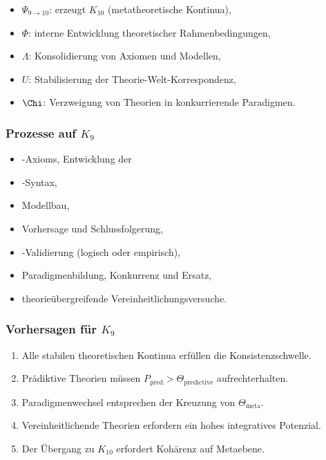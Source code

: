 \begin{itemize}
    \item $\Psi_{9\to10}$: erzeugt $K_{10}$ (metatheoretische Kontinua),
    \item $\Phi$: interne Entwicklung theoretischer Rahmenbedingungen,
    \item $\Lambda$: Konsolidierung von Axiomen und Modellen,
    \item $U$: Stabilisierung der Theorie-Welt-Korrespondenz,
    \item $\Chi$: Verzweigung von Theorien in konkurrierende Paradigmen.
\end{itemize}

\subsubsection{Prozesse auf \texorpdfstring{$K_9$}{K_9}}

\begin{itemize}
    Auswahl und Überarbeitung des \item-Axioms,
    Entwicklung der \item-Syntax,
    \item Modellbau,
    \item Vorhersage und Schlussfolgerung,
    \item-Validierung (logisch oder empirisch),
    \item Paradigmenbildung, Konkurrenz und Ersatz,
    \item theorieübergreifende Vereinheitlichungsversuche.
\end{itemize}

\subsubsection{Vorhersagen für \texorpdfstring{$K_9$}{K_9}}

\begin{enumerate}
    \item Alle stabilen theoretischen Kontinua erfüllen die Konsistenzschwelle.
    \item Prädiktive Theorien müssen $P_{\mathrm{pred}} > \Theta_{\mathrm{predictive}}$ aufrechterhalten.
    \item Paradigmenwechsel entsprechen der Kreuzung von $\Theta_{\mathrm{meta}}$.
    \item Vereinheitlichende Theorien erfordern ein hohes integratives Potenzial.
    \item Der Übergang zu $K_{10}$ erfordert Kohärenz auf Metaebene.
\end{enumerate}

